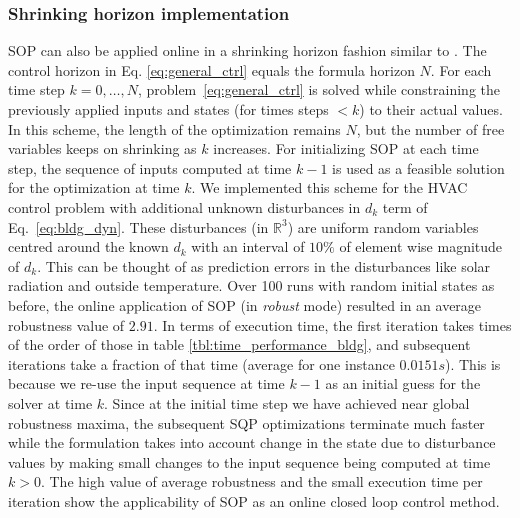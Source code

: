 \subsubsection{Shrinking horizon implementation} 
\label{sec:online}
SOP can also be applied online in a shrinking horizon fashion similar to \cite{Raman14_MPCSTL}. 
The control horizon in Eq. \eqref{eq:general_ctrl} equals the formula horizon $N$. %
For each time step $k=0,\dotsc,N$, problem~\eqref{eq:general_ctrl} is solved while constraining the previously applied inputs and states (for times steps $<k$) to their actual values. 
In this scheme, the length of the optimization remains $N$, but the number of free variables keeps on shrinking as $k$ increases. 
For initializing SOP at each time step, the sequence of inputs computed at time $k-1$ is used as a feasible solution for the optimization at time $k$. 
We implemented this scheme for the HVAC control problem with additional unknown disturbances in $d_k$ term of Eq.~\eqref{eq:bldg_dyn}.
These disturbances (in $\mathbb{R}^3$) are uniform random variables centred around the known $d_k$ with an interval of $10\%$ of element wise magnitude of $d_k$. This can be thought of as prediction errors in the disturbances like solar radiation and outside temperature. Over 100 runs with random initial states as before, the online application of SOP (in \textit{robust} mode) resulted in an average robustness value of $2.91$. In terms of execution time, the first iteration takes times of the order of those in table \ref{tbl:time_performance_bldg}, and subsequent iterations take a fraction of that time (average for one instance $0.0151s$). This is because we re-use the input sequence at time $k-1$ as an initial guess for the solver at time $k$. Since at the initial time step we have achieved near global robustness maxima, the subsequent SQP optimizations terminate much faster while the formulation takes into account change in the state due to disturbance values by making small changes to the input sequence being computed at time $k>0$. The high value of average robustness and the small execution time per iteration show the applicability of SOP as an online closed loop control method. 
